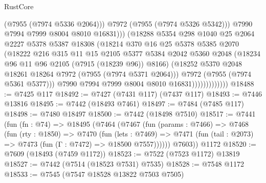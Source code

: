 \begin{lexlean}{RustCore}
\begin{coremodule}
                                    (@7955 (@7974 @5336 @2064)))
                                  @7972
                                  (@7955 (@7974 @5326 @5342)))
                                @7990
                                @7994
                                @7999
                                @8004
                                @8010
                                @16831)))
                          (@18288
                            @5354
                            @298
                            @1040
                            @25
                            @2064
                            @2227
                            @5378
                            @5387
                            @18308
                            (@18214
                              @370
                              @16
                              @25
                              @5378
                              @5385
                              @2070
                              (@18222
                                @216
                                @315
                                @11
                                @15
                                @2105
                                @5377
                                @5384
                                @2042
                                @5360
                                @2048
                                (@18234 @96 @11 @96 @2105 (@7915 (@18239 @96)) @8166)
                                (@18252 @5370 @2048 @18261 @18264 @7972 (@7955 (@7974 @5371 @2064)))
                                @7972
                                (@7955 (@7974 @5361 @5377)))
                              @7990
                              @7994
                              @7999
                              @8004
                              @8010
                              @16831)))))))))))))
@18488 := @7425 @117
@18492 := @7427 (@7431 @117) (@7437 @117)
@18493 := @7446 @13816
@18495 := @7442 (@18493 @7461)
@18497 := @7484 (@7485 @117)
@18498 := @7480 @18497
@18500 := @7442 (@18498 @7510)
@18517 := @7441
    (fun (fn : @74) =>
    @18495
      (@7464
        (@7467
          (fun (params : @7466) =>
          @7468
            (fun (rty : @1850) =>
            @7470
              (fun (lets : @7469) =>
              @7471 (fun (tail : @2073) => @7473 (fun (Γ : @7472) => @18500 @7557))))))
        @7603))
    @1172
@18520 := @7609 (@18493 (@7459 @1172))
@18523 := @7522 (@7523 @1172) @13819
@18527 := @7442 (@7514 (@18523 @7531) @7535)
@18528 := @7548 @1172
@18533 := @7545 (@7547 @18528 @13822 @7503 @7505)

\end{coremodule}
\end{lexlean}
